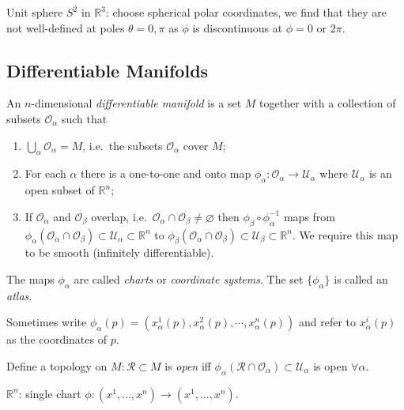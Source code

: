\documentclass[a4paper,11pt]{article}
\DeclareMathOperator{\cpf}{\circ}
\begin{document}
	\begin{ex}
		Unit sphere $S^2$ in $\mathbb{R}^3$: choose spherical polar coordinates, we find that they are not well-defined at poles $\theta = 0, \pi$ as $\phi$ is discontinuous at $\phi = 0$ or $2\pi$.
	\end{ex}

	\subsection{Differentiable Manifolds}

	\begin{defi}
		An $n$-dimensional \emph{differentiable manifold} is a set $M$ together with a collection of subsets $\mathcal{O}_{\alpha}$ such that
		\begin{enumerate}
			\item $\bigcup_{\alpha} \mathcal{O}_\alpha = M$, i.e.\ the subsets $\mathcal{O}_{\alpha}$ cover $M$;
			\item For each $\alpha$ there is a one-to-one and onto map $\phi_{\alpha}: \mathcal{O}_{\alpha} \to \mathcal{U}_{\alpha}$ where $\mathcal{U}_{\alpha}$ is an open subset of $\mathbb{R}^n$;
			\item If $\mathcal{O}_{\alpha}$ and $\mathcal{O}_{\beta}$ overlap, i.e.\ $\mathcal{O}_\alpha \cap \mathcal{O}_\beta \neq \varnothing$ then $\phi_{\beta} \cpf \phi_{\alpha}^{-1}$ maps from $\phi_{\alpha}(\mathcal{O}_{\alpha} \cap \mathcal{O}_{\beta}) \subset \mathcal{U}_{\alpha} \subset \mathbb{R}^n$ to $\phi_{\beta}(\mathcal{O}_\alpha \cap \mathcal{O}_\beta) \subset \mathcal{U}_\beta \subset \mathbb{R}^n$. We require this map to be smooth (infinitely differentiable).    
		\end{enumerate}
		
		The maps $\phi_\alpha$ are called \emph{charts} or \emph{coordinate systems}. The set $\{\phi_\alpha\}$ is called an \emph{atlas}.
	
	\end{defi}

	Sometimes write $\phi_\alpha(p) = (x_\alpha^1 (p), x_\alpha^2 (p), \cdots, x_\alpha^n (p))$ and refer to $x^i_\alpha(p)$ as the coordinates of $p$.

	Define a topology on $M: \mathcal{R} \subset M$ is \emph{open} iff $\phi_\alpha (\mathcal{R}\cap \mathcal{O}_\alpha) \subset \mathcal{U}_{\alpha}$ is open $\forall \alpha$.  

	\begin{ex}
		$\mathbb{R}^n$: single chart $\phi: (x^1, \dots, x^n) \to (x^1, \dots, x^n)$. 
	\end{ex}
\end{document}
